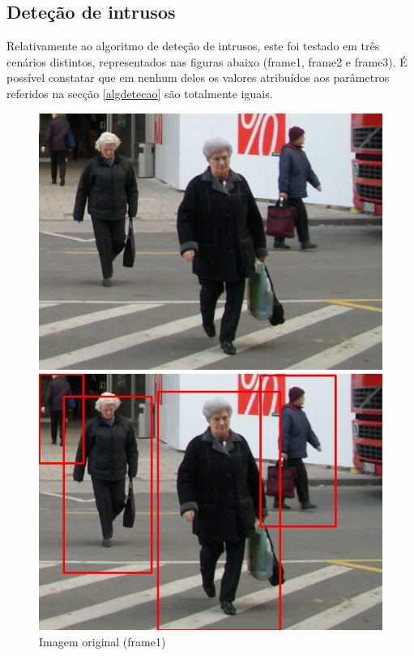 \subsection{Deteção de intrusos}

Relativamente ao algoritmo de deteção de intrusos, este foi testado em três cenários distintos, representados nas figuras abaixo (frame1, frame2 e frame3). É possível constatar que em nenhum deles os valores atribuídos aos parâmetros referidos na secção \ref{algdetecao} são totalmente iguais.




\begin{figure}[h]
	\centering
	\begin{minipage}[b]{0.4\textwidth}
		\centering
		\includegraphics[width=\textwidth]{img/vision/exemplos/frame1.jpg}
		\caption[Imagem original (frame1)]{Imagem original (frame1) \newline \newline}
		\label{bluetth05-res}
	\end{minipage}
	\hfill
	\begin{minipage}[b]{0.4\textwidth}
		\centering
		\includegraphics[width=\textwidth]{img/vision/exemplos/result_frame1.jpg}

\end{minipage}
\end{figure}
